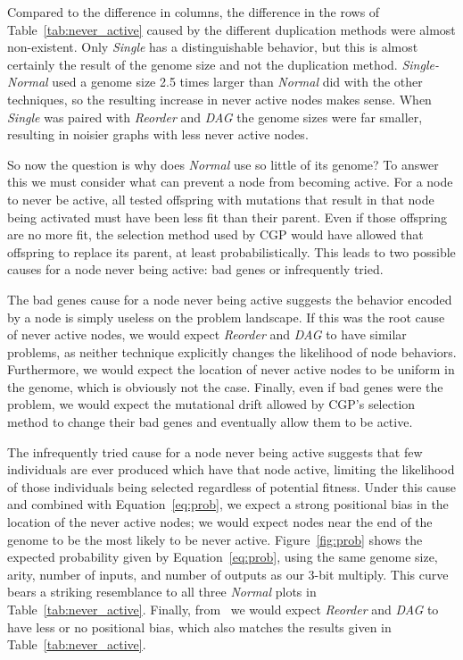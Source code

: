 \documentclass[journal]{IEEEtran}
\begin{document}
Compared to the difference in columns, the difference in the rows of Table~\ref{tab:never_active}
caused by the different duplication methods were almost non-existent.  Only
\emph{Single} has a distinguishable behavior, but this is almost certainly the result
of the genome size and not the duplication method.  \emph{Single-Normal} used
a genome size 2.5 times larger than \emph{Normal} did with the other techniques,
so the resulting increase in never active nodes makes sense.  When \emph{Single}
was paired with \emph{Reorder} and \emph{DAG} the genome sizes were far smaller,
resulting in noisier graphs with less never active nodes.

So now the question is why does \emph{Normal} use so little of its genome?  To
answer this we must consider what can prevent a node from becoming active.  For
a node to never be active, all tested offspring with mutations that result in that node being activated
must have been less fit than their parent.  Even if those offspring are no more fit, the selection method
used by CGP would have allowed that offspring to replace its parent, at least probabilistically.  This leads
to two possible causes for a node never being active: bad genes or infrequently tried.

The bad genes cause for a node never being active suggests the behavior encoded
by a node is simply useless on the problem landscape.  If this was the root cause
of never active nodes, we would expect \emph{Reorder} and \emph{DAG} to have
similar problems, as neither technique explicitly changes the likelihood of node
behaviors.  Furthermore, we would expect the location of never active nodes to be
uniform in the genome, which is obviously not the case.  Finally, even if bad
genes were the problem, we would expect the mutational drift allowed by CGP's
selection method to change their bad genes and eventually allow them to be active.

The infrequently tried cause for a node never being active suggests that few
individuals are ever produced which have that node active, limiting the likelihood
of those individuals being selected regardless of potential fitness.  Under this
cause and combined with Equation~\ref{eq:prob}, we
expect a strong positional bias in the location of the never active nodes;
we would expect nodes near the end of the genome to be the most likely to be never active.
Figure~\ref{fig:prob} shows the expected probability given by Equation~\ref{eq:prob},
using the same genome size, arity, number of inputs, and number of outputs as our
3-bit multiply.  This curve bears a striking resemblance to all three \emph{Normal}
plots in Table~\ref{tab:never_active}.
Finally, from~\cite{goldman:2013:ordering} we would expect \emph{Reorder} and \emph{DAG}
to have less or no positional bias, which also matches the results given in Table~\ref{tab:never_active}.
\end{document}
